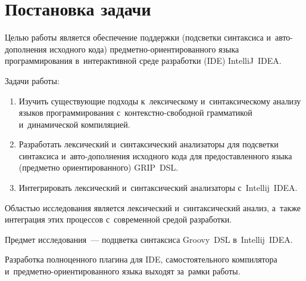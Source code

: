 \section{Постановка задачи} \label{sub21}

Целью работы является обеспечение поддержки (подсветки синтаксиса и~авто-дополнения исходного кода) предметно-ориентированного языка программирования в~интерактивной среде разработки (IDE) IntelliJ~IDEA.

Задачи работы: 

\begin{enumerate} 
\item{Изучить существующие подходы к~лексическому и~синтаксическому анализу языков программирования с~контекстно-свободной грамматикой и~динамической компиляцией.}	
\item{Разработать лексический и~синтаксический анализаторы для подсветки синтаксиса и~авто-дополнения исходного кода для предоставленного языка (предметно ориентированного) GRIP~DSL.}
\item{Интегрировать лексический и~синтаксический анализаторы с~Intellij~IDEA.}
\end{enumerate} 

Областью исследования является лексический и~синтаксический анализ, а~также интеграция этих процессов с~современной средой разработки.

Предмет исследования~--- подцветка синтаксиса Groovy~DSL в~Intellij~IDEA.

Разработка полноценного плагина для IDE, самостоятельного компилятора и~предметно-ориентированного языка выходят за~рамки работы.
